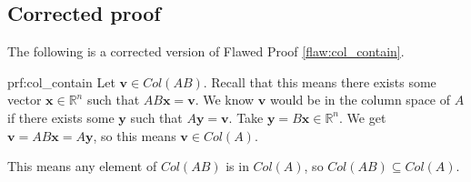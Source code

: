 \clearpage
\subsection{Corrected proof}

The following is a corrected version of Flawed Proof \ref{flaw:col_contain}. %

\begin{prf}{prf:col_contain} %
Let $\bm{v} \in Col(AB)$. Recall that this means there exists some vector $\bm{x} \in \mathbb{R}^n$ such that $AB\bm{x} = \bm{v}$. We know $\bm{v}$ would be in the column space of $A$ if there exists some $\bm{y}$ such that $A\bm{y} = \bm{v}$. Take $\bm{y} = B\bm{x} \in \mathbb{R}^n$. We get $\bm{v} = AB\bm{x} = A\bm{y}$, so this means $\bm{v} \in Col(A)$.


This means any element of $Col(AB)$ is in $Col(A)$, so $Col(AB) \subseteq Col(A)$.

\end{prf} 